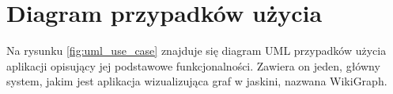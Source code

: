 \section{Diagram przypadków użycia}
Na rysunku \ref{fig:uml_use_case} znajduje się diagram UML przypadków użycia aplikacji opisujący jej podstawowe funkcjonalności. Zawiera on jeden, główny system, jakim jest aplikacja wizualizująca graf w jaskini, nazwana WikiGraph.


